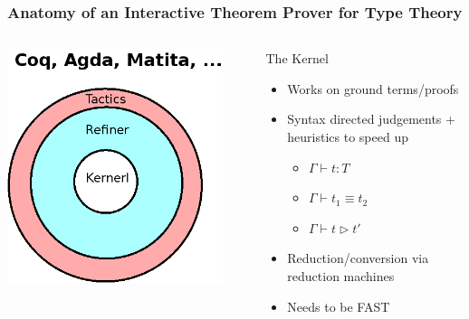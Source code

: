 \documentclass{beamer}
\begin{document}
\begin{frame}[fragile]
\frametitle{\small Anatomy of an Interactive Theorem Prover for Type Theory}
\begin{columns}
 \includegraphics[width=0.9\textwidth]{architettura.png}
 \begin{block}{The Kernel}
  \begin{itemize}
   \item Works on \alert{ground terms/proofs}
   \item Syntax directed judgements + heuristics to speed up
    \begin{itemize}
     \item $\Gamma \vdash t : T$
     \item $\Gamma \vdash t_1 \equiv t_2$
     \item $\Gamma \vdash t \rhd t'$
    \end{itemize}
   \item Reduction/conversion via \alert{reduction machines}
   \item Needs to be FAST
  \end{itemize}
 \end{block}
\end{columns}
\end{frame}
\end{document}

